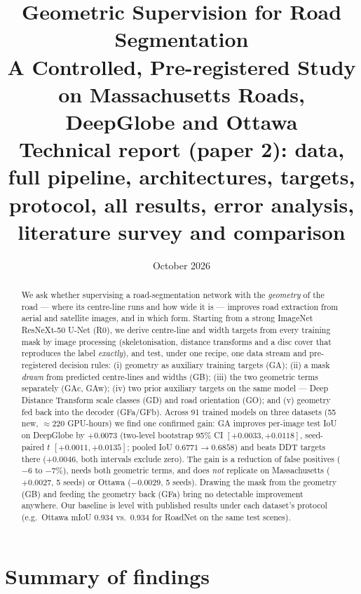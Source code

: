 \documentclass[11pt]{article}
\title{Geometric Supervision for Road Segmentation\\[0.3em]
\large A Controlled, Pre-registered Study on Massachusetts Roads, DeepGlobe and Ottawa\\[0.2em]
\normalsize Technical report (paper 2): data, full pipeline, architectures, targets, protocol,
all results, error analysis, literature survey and comparison}
\author{}
\date{October 2026}
\begin{document}
\maketitle

\begin{abstract}
We ask whether supervising a road-segmentation network with the \emph{geometry} of the road ---
where its centre-line runs and how wide it is --- improves road extraction from aerial and
satellite images, and in which form. Starting from a strong ImageNet ResNeXt-50 U-Net (R0), we
derive centre-line and width targets from every training mask by image processing (skeletonisation,
distance transforms and a disc cover that reproduces the label \emph{exactly}), and test, under one
recipe, one data stream and pre-registered decision rules: (i) geometry as auxiliary training targets
(GA); (ii) a mask \emph{drawn} from predicted centre-lines and widths (GB); (iii) the two geometric
terms separately (GAc, GAw); (iv) two prior auxiliary targets on the same model --- Deep Distance
Transform scale classes (GD) and road orientation (GO); and (v) geometry fed back into the decoder
(GFa/GFb). Across 91 trained models on three datasets (55 new, ${\approx}220$ GPU-hours) we find one
confirmed gain: GA improves per-image test IoU on DeepGlobe by $+0.0073$ (two-level bootstrap 95\% CI
$[+0.0033,+0.0118]$, seed-paired $t$ $[+0.0011,+0.0135]$; pooled IoU $0.6771\to0.6858$) and beats DDT
targets there ($+0.0046$, both intervals exclude zero). The gain is a reduction of false positives
(${-}6$ to ${-}7\%$), needs both geometric terms, and does \emph{not} replicate on Massachusetts
($+0.0027$, 5 seeds) or Ottawa ($-0.0029$, 5 seeds). Drawing the mask from the geometry (GB) and
feeding the geometry back (GFa) bring no detectable improvement anywhere. Our baseline is level with
published results under each dataset's protocol (e.g.\ Ottawa mIoU 0.934 vs.\ 0.934 for RoadNet on the
same test scenes).
\end{abstract}

\tableofcontents
\newpage

\section{Summary of findings}
\end{document}
